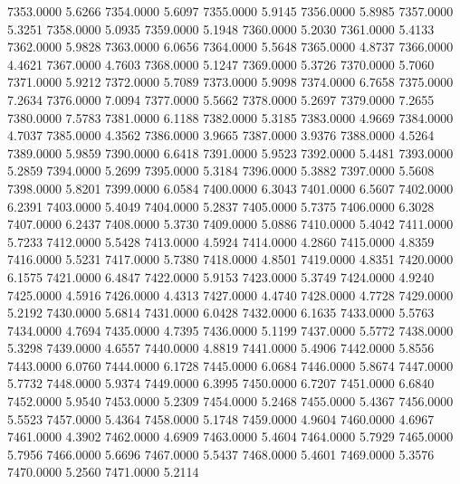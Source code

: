 7353.0000      5.6266
7354.0000      5.6097
7355.0000      5.9145
7356.0000      5.8985
7357.0000      5.3251
7358.0000      5.0935
7359.0000      5.1948
7360.0000      5.2030
7361.0000      5.4133
7362.0000      5.9828
7363.0000      6.0656
7364.0000      5.5648
7365.0000      4.8737
7366.0000      4.4621
7367.0000      4.7603
7368.0000      5.1247
7369.0000      5.3726
7370.0000      5.7060
7371.0000      5.9212
7372.0000      5.7089
7373.0000      5.9098
7374.0000      6.7658
7375.0000      7.2634
7376.0000      7.0094
7377.0000      5.5662
7378.0000      5.2697
7379.0000      7.2655
7380.0000      7.5783
7381.0000      6.1188
7382.0000      5.3185
7383.0000      4.9669
7384.0000      4.7037
7385.0000      4.3562
7386.0000      3.9665
7387.0000      3.9376
7388.0000      4.5264
7389.0000      5.9859
7390.0000      6.6418
7391.0000      5.9523
7392.0000      5.4481
7393.0000      5.2859
7394.0000      5.2699
7395.0000      5.3184
7396.0000      5.3882
7397.0000      5.5608
7398.0000      5.8201
7399.0000      6.0584
7400.0000      6.3043
7401.0000      6.5607
7402.0000      6.2391
7403.0000      5.4049
7404.0000      5.2837
7405.0000      5.7375
7406.0000      6.3028
7407.0000      6.2437
7408.0000      5.3730
7409.0000      5.0886
7410.0000      5.4042
7411.0000      5.7233
7412.0000      5.5428
7413.0000      4.5924
7414.0000      4.2860
7415.0000      4.8359
7416.0000      5.5231
7417.0000      5.7380
7418.0000      4.8501
7419.0000      4.8351
7420.0000      6.1575
7421.0000      6.4847
7422.0000      5.9153
7423.0000      5.3749
7424.0000      4.9240
7425.0000      4.5916
7426.0000      4.4313
7427.0000      4.4740
7428.0000      4.7728
7429.0000      5.2192
7430.0000      5.6814
7431.0000      6.0428
7432.0000      6.1635
7433.0000      5.5763
7434.0000      4.7694
7435.0000      4.7395
7436.0000      5.1199
7437.0000      5.5772
7438.0000      5.3298
7439.0000      4.6557
7440.0000      4.8819
7441.0000      5.4906
7442.0000      5.8556
7443.0000      6.0760
7444.0000      6.1728
7445.0000      6.0684
7446.0000      5.8674
7447.0000      5.7732
7448.0000      5.9374
7449.0000      6.3995
7450.0000      6.7207
7451.0000      6.6840
7452.0000      5.9540
7453.0000      5.2309
7454.0000      5.2468
7455.0000      5.4367
7456.0000      5.5523
7457.0000      5.4364
7458.0000      5.1748
7459.0000      4.9604
7460.0000      4.6967
7461.0000      4.3902
7462.0000      4.6909
7463.0000      5.4604
7464.0000      5.7929
7465.0000      5.7956
7466.0000      5.6696
7467.0000      5.5437
7468.0000      5.4601
7469.0000      5.3576
7470.0000      5.2560
7471.0000      5.2114
